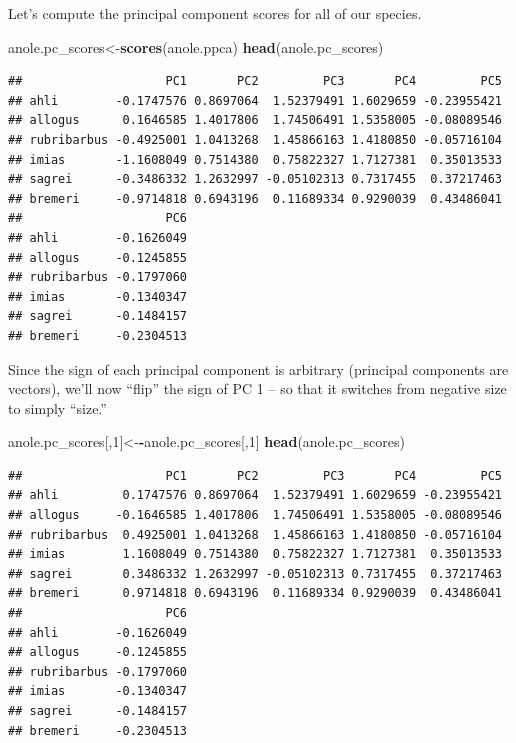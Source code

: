 \documentclass[fleqn,10pt,lineno]{wlpeerj} %
\newenvironment{Shaded}{\begin{snugshade}}{\end{snugshade}}
\newcommand{\DecValTok}[1]{\textcolor[rgb]{0.00,0.00,0.81}{#1}}
\newcommand{\FunctionTok}[1]{\textcolor[rgb]{0.13,0.29,0.53}{\textbf{#1}}}
\newcommand{\NormalTok}[1]{#1}
\newcommand{\OtherTok}[1]{\textcolor[rgb]{0.56,0.35,0.01}{#1}}
\newcommand{\SpecialCharTok}[1]{\textcolor[rgb]{0.81,0.36,0.00}{\textbf{#1}}}
\begin{document}
Let's compute the principal component scores for all of our species.

\begin{Shaded}
\begin{Highlighting}[]
\NormalTok{anole.pc\_scores}\OtherTok{\textless{}{-}}\FunctionTok{scores}\NormalTok{(anole.ppca)}
\FunctionTok{head}\NormalTok{(anole.pc\_scores)}
\end{Highlighting}
\end{Shaded}

\begin{verbatim}
##                    PC1       PC2         PC3       PC4         PC5
## ahli        -0.1747576 0.8697064  1.52379491 1.6029659 -0.23955421
## allogus      0.1646585 1.4017806  1.74506491 1.5358005 -0.08089546
## rubribarbus -0.4925001 1.0413268  1.45866163 1.4180850 -0.05716104
## imias       -1.1608049 0.7514380  0.75822327 1.7127381  0.35013533
## sagrei      -0.3486332 1.2632997 -0.05102313 0.7317455  0.37217463
## bremeri     -0.9714818 0.6943196  0.11689334 0.9290039  0.43486041
##                    PC6
## ahli        -0.1626049
## allogus     -0.1245855
## rubribarbus -0.1797060
## imias       -0.1340347
## sagrei      -0.1484157
## bremeri     -0.2304513
\end{verbatim}

Since the sign of each principal component is arbitrary (principal components are vectors), we'll now ``flip'' the sign of PC 1 -- so that it switches from negative size to simply ``size.''

\begin{Shaded}
\begin{Highlighting}[]
\NormalTok{anole.pc\_scores[,}\DecValTok{1}\NormalTok{]}\OtherTok{\textless{}{-}}\SpecialCharTok{{-}}\NormalTok{anole.pc\_scores[,}\DecValTok{1}\NormalTok{]}
\FunctionTok{head}\NormalTok{(anole.pc\_scores)}
\end{Highlighting}
\end{Shaded}

\begin{verbatim}
##                    PC1       PC2         PC3       PC4         PC5
## ahli         0.1747576 0.8697064  1.52379491 1.6029659 -0.23955421
## allogus     -0.1646585 1.4017806  1.74506491 1.5358005 -0.08089546
## rubribarbus  0.4925001 1.0413268  1.45866163 1.4180850 -0.05716104
## imias        1.1608049 0.7514380  0.75822327 1.7127381  0.35013533
## sagrei       0.3486332 1.2632997 -0.05102313 0.7317455  0.37217463
## bremeri      0.9714818 0.6943196  0.11689334 0.9290039  0.43486041
##                    PC6
## ahli        -0.1626049
## allogus     -0.1245855
## rubribarbus -0.1797060
## imias       -0.1340347
## sagrei      -0.1484157
## bremeri     -0.2304513
\end{verbatim}
\end{document}
